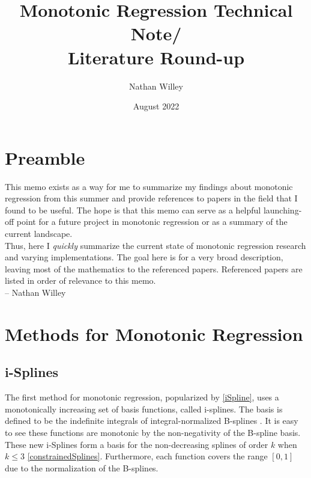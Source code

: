\documentclass{article}
\title{Monotonic Regression Technical Note/ \\ Literature Round-up}
\author{Nathan Willey}
\date{August 2022}
\begin{document}
	
	\maketitle
	
	\section*{Preamble}
	This memo exists as a way for me to summarize my findings about monotonic regression from this summer and provide references to papers in the field that I found to be useful. The hope is that this memo can serve as a helpful launching-off point for a future project in monotonic regression or as a summary of the current landscape. \\
	Thus, here I \textit{quickly} summarize the current state of monotonic regression research and varying implementations. The goal here is for a very broad description, leaving most of the mathematics to the referenced papers. Referenced papers are listed in order of relevance to this memo. \\
	-- Nathan Willey
	
	\newpage
	
	\section*{Methods for Monotonic Regression}
	
	\subsection{i-Splines}
	The first method for monotonic regression, popularized by \ref{iSpline}, uses a monotonically increasing set of basis functions, called i-splines. The basis is defined to be the indefinite integrals of integral-normalized B-splines . It is easy to see these functions are monotonic by the non-negativity of the B-spline basis. These new i-Splines form a basis for the non-decreasing splines of order $k$ when $k \leq 3$ \ref{constrainedSplines}. Furthermore, each function covers the range $[0,1]$ due to the normalization of the B-splines. \\
	
\end{document}
